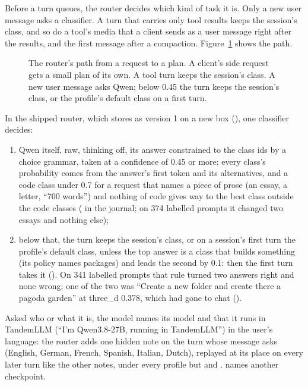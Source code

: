 Before a turn queues, the router decides which kind of task it is. Only a new user message asks a classifier. A turn that carries only tool results keeps the session's class, and so do a tool's media that a client sends as a user message right after the results, and the first message after a compaction. Figure~\ref{fig:router} shows the path.

\begin{figure}[htbp]
\centering

\caption[The router's path from a request to a plan]{The router's path from a request to a plan. A client's side request gets a small plan of its own. A tool turn keeps the session's class. A new user message asks Qwen; below 0.45 the turn keeps the session's class, or the profile's default class on a first turn.}\label{fig:router}
\end{figure}

In the shipped router, which  stores as version 1 on a new box (), one classifier decides:

\begin{enumerate}
\item Qwen itself, raw, thinking off, its answer constrained to the class ids by a choice grammar, taken at a confidence of 0.45 or more; every class's probability comes from the answer's first token and its alternatives, and a code class under 0.7 for a request that names a piece of prose (an essay, a letter, ``700 words'') and nothing of code gives way to the best class outside the code classes ( in the journal; on 374 labelled prompts it changed two essays and nothing else);
\item below that, the turn keeps the session's class, or on a session's first turn the profile's default class, unless the top answer is a class that builds something (its policy names packages) and leads the second by 0.1: then the first turn takes it (). On 341 labelled prompts that rule turned two answers right and none wrong; one of the two was \enquote{Create a new folder and create there a pagoda garden} at three\_d 0.378, which had gone to chat (\measured).
\end{enumerate}

Asked who or what it is, the model names its model and that it runs in TandemLLM (``I'm Qwen3.8-27B, running in TandemLLM'') in the user's language: the router adds one hidden note on the turn whose message asks (English, German, French, Spanish, Italian, Dutch), replayed at its place on every later turn like the other notes, under every profile but  and .  names another checkpoint.

